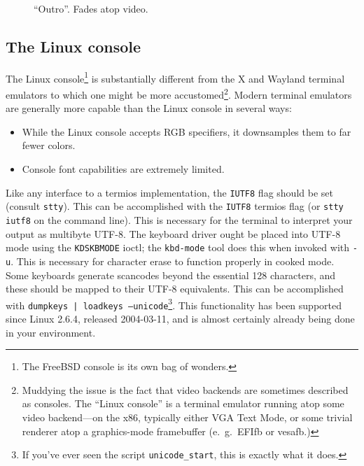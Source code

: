 \documentclass[letterpaper,10pt]{article}
\newenvironment{denseitemize}{
  \begin{itemize}
      \setlength{\itemsep}{0pt}
}{
  \end{itemize}
}
\begin{document}
\begin{figure}
\begin{minipage}{0.45\textwidth}
    \caption{``Outro''. Fades atop video.}
  \end{minipage}\hfill
\end{figure}

\clearpage
\cleardoublepage
\begin{appendices}


\pagebreak
\cleardoublepage


\pagebreak
\cleardoublepage


\section{The Linux console}
The Linux console\footnote{The FreeBSD console is its own bag of wonders.} is
substantially different from the X and Wayland terminal emulators to which one
might be more accustomed\footnote{Muddying the issue is the fact that video
backends are sometimes described as consoles. The ``Linux console'' is a terminal
emulator running atop some video backend---on the x86, typically either VGA
Text Mode, or some trivial renderer atop a graphics-mode framebuffer
(e.\ g.\ EFIfb or vesafb.)}. Modern terminal emulators are generally more capable
than the Linux console in several ways:

\begin{denseitemize}
\item{While the Linux console accepts RGB specifiers, it downsamples them to
    far fewer colors.}
\item{Console font capabilities are extremely limited.}
\end{denseitemize}

Like any interface to a termios\cite{termios} implementation, the \texttt{IUTF8}
flag should be set (consult \texttt{stty}). This can be accomplished with the
\texttt{IUTF8} termios flag (or \texttt{stty iutf8} on the command line). This
is necessary for the terminal to interpret your output as multibyte UTF-8. The
keyboard driver ought be placed into UTF-8 mode using the \texttt{KDSKBMODE}
ioctl; the \texttt{kbd-mode} tool does this when invoked with \texttt{-u}.
This is necessary for character erase to function properly in cooked mode. Some
keyboards generate scancodes beyond the essential 128 characters, and these
should be mapped to their UTF-8 equivalents. This can be accomplished with
\texttt{dumpkeys | loadkeys --unicode}\footnote{If you've ever seen the script
\texttt{unicode\_start}, this is exactly what it does.}. This functionality has
been supported since Linux 2.6.4, released 2004-03-11, and is almost certainly
already being done in your environment.


\end{appendices}
\end{document}
